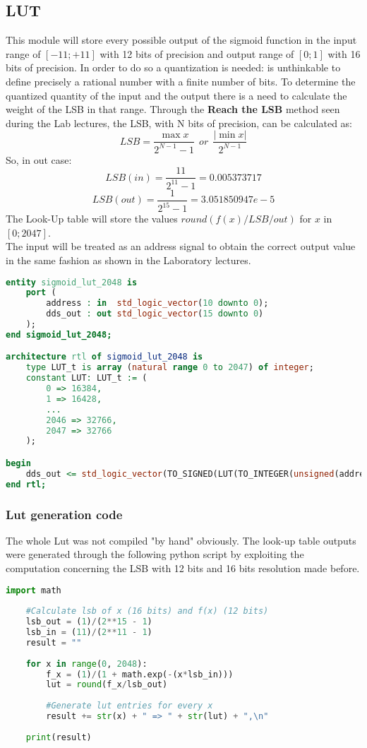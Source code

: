 \subsection{LUT}
This module will store every possible output of the sigmoid function in the input range of $[-11; +11]$ with 12 bits of precision and output range of $[0; 1]$ with 16 bits of precision. In order to do so a quantization is needed: is unthinkable to define precisely a rational number with a finite number of bits. To determine the quantized quantity of the input and the output there is a need to calculate the weight of the LSB in that range. Through the \textbf{Reach the LSB} method seen during the Lab lectures, the LSB, with N bits of precision, can be calculated as:
\begin{equation}
LSB = \frac{\max{x}}{2^{N-1}-1}\ \ or\ \ \frac{|\min{x}|}{2^{N-1}}
\end{equation}
So, in out case:
\begin{equation}
LSB(in) = \frac{11}{2^{11} - 1} = 0.005373717
\end{equation}
\begin{equation}
LSB(out) = \frac{1}{2^{15} -1} = 3.051850947e-5
\end{equation}
The Look-Up table will store the values $round(f(x)/LSB/out)$ for $x$ in $[0; 2047]$.\\
The input will be treated as an address signal to obtain the correct output value in the same fashion as shown in the Laboratory lectures.
\begin{lstlisting}[language=VHDL]
entity sigmoid_lut_2048 is
	port (
		address : in  std_logic_vector(10 downto 0);
		dds_out : out std_logic_vector(15 downto 0) 
	);
end sigmoid_lut_2048;

architecture rtl of sigmoid_lut_2048 is
	type LUT_t is array (natural range 0 to 2047) of integer;
	constant LUT: LUT_t := (
		0 => 16384,
		1 => 16428,
		...
		2046 => 32766,
		2047 => 32766
	);

begin
	dds_out <= std_logic_vector(TO_SIGNED(LUT(TO_INTEGER(unsigned(address))),16));
end rtl;	
\end{lstlisting}

\subsubsection{Lut generation code}
The whole Lut was not compiled "by hand" obviously. The look-up table outputs were generated through the following python script by exploiting the computation concerning the LSB with 12 bits and 16 bits resolution made before.
\begin{lstlisting}[language=Python]
	import math
	
	#Calculate lsb of x (16 bits) and f(x) (12 bits)
	lsb_out = (1)/(2**15 - 1)
	lsb_in = (11)/(2**11 - 1)
	result = ""
	
	for x in range(0, 2048):
		f_x = (1)/(1 + math.exp(-(x*lsb_in)))
		lut = round(f_x/lsb_out)
		
		#Generate lut entries for every x
		result += str(x) + " => " + str(lut) + ",\n"
	
	print(result)
	
\end{lstlisting}